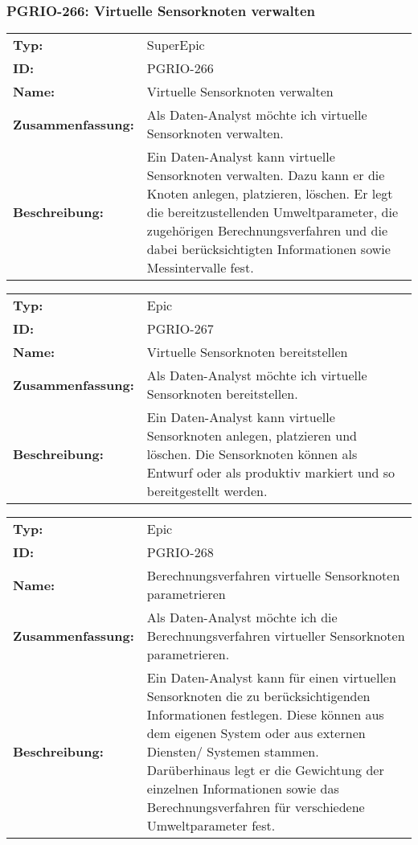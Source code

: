 \subsubsection{PGRIO-266: Virtuelle Sensorknoten verwalten} 
\begin{flushleft} 
\begin{tabular}{@{}lp{100mm}} 
\textbf{Typ:} & SuperEpic \\ 
\textbf{ID:} & PGRIO-266 \\ 
\textbf{Name:} & Virtuelle Sensorknoten verwalten \\ 
\textbf{Zusammenfassung:} & Als Daten-Analyst möchte ich virtuelle Sensorknoten verwalten. \\ 
\textbf{Beschreibung:} & Ein Daten-Analyst kann virtuelle Sensorknoten verwalten. Dazu kann er die Knoten anlegen, platzieren, löschen. Er legt die bereitzustellenden Umweltparameter, die zugehörigen Berechnungsverfahren und die dabei berücksichtigten Informationen sowie Messintervalle fest. \\ 
\end{tabular} 
\end{flushleft} 

		\begin{flushleft} 
\begin{tabular}{@{}lp{100mm}} 
\textbf{Typ:} & Epic \\ 
\textbf{ID:} & PGRIO-267 \\ 
\textbf{Name:} & Virtuelle Sensorknoten bereitstellen \\ 
\textbf{Zusammenfassung:} & Als Daten-Analyst möchte ich virtuelle Sensorknoten bereitstellen. \\ 
\textbf{Beschreibung:} & Ein Daten-Analyst kann virtuelle Sensorknoten anlegen, platzieren und löschen. Die Sensorknoten können als Entwurf oder als produktiv markiert und so bereitgestellt werden. \\ 
\end{tabular} 
\end{flushleft} 

		\begin{flushleft} 
\begin{tabular}{@{}lp{100mm}} 
\textbf{Typ:} & Epic \\ 
\textbf{ID:} & PGRIO-268 \\ 
\textbf{Name:} & Berechnungsverfahren virtuelle Sensorknoten parametrieren \\ 
\textbf{Zusammenfassung:} & Als Daten-Analyst möchte ich die Berechnungsverfahren virtueller Sensorknoten parametrieren. \\ 
\textbf{Beschreibung:} & Ein Daten-Analyst kann für einen virtuellen Sensorknoten die zu berücksichtigenden Informationen festlegen. Diese können aus dem eigenen System oder aus externen Diensten/ Systemen stammen. Darüberhinaus legt er die Gewichtung der einzelnen Informationen sowie das Berechnungsverfahren für verschiedene Umweltparameter fest. \\ 
\end{tabular} 
\end{flushleft} 

